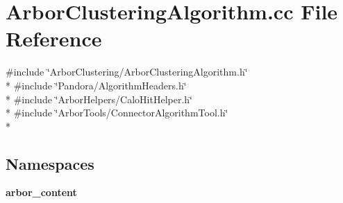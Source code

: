 \section{Arbor\+Clustering\+Algorithm.\+cc File Reference}
\label{ArborClusteringAlgorithm_8cc}
{\ttfamily \#include \char`\"{}Arbor\+Clustering/\+Arbor\+Clustering\+Algorithm.\+h\char`\"{}}\\*
{\ttfamily \#include \char`\"{}Pandora/\+Algorithm\+Headers.\+h\char`\"{}}\\*
{\ttfamily \#include \char`\"{}Arbor\+Helpers/\+Calo\+Hit\+Helper.\+h\char`\"{}}\\*
{\ttfamily \#include \char`\"{}Arbor\+Tools/\+Connector\+Algorithm\+Tool.\+h\char`\"{}}\\*
\subsection*{Namespaces}
\begin{DoxyCompactItemize}
\item 
 {\bf arbor\+\_\+content}
\end{DoxyCompactItemize}
